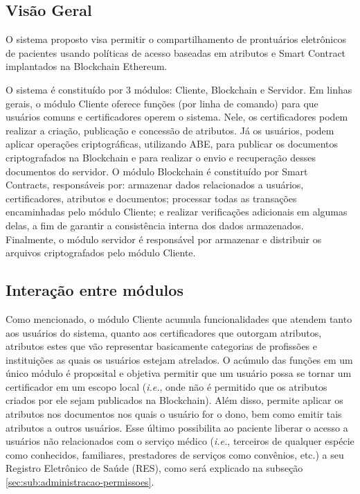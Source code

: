 \documentclass[a4paper,11pt]{article}
\begin{document}
\subsection{Visão Geral}
\label{sec:sub:visaogeral}


O sistema proposto visa permitir o compartilhamento de prontuários eletrônicos de pacientes usando políticas de acesso baseadas em atributos e Smart Contract implantados na Blockchain Ethereum.

O sistema é constituído por 3 módulos: Cliente, Blockchain e Servidor.
Em linhas gerais, o módulo Cliente oferece funções (por linha de comando) para que usuários comuns e certificadores operem o sistema.
Nele, os certificadores podem realizar a criação, publicação e concessão de atributos. Já os usuários, podem aplicar operações criptográficas, utilizando ABE, para publicar os documentos criptografados na Blockchain e para realizar o envio e recuperação desses documentos do servidor.
O módulo Blockchain é constituído por Smart Contracts, responsáveis por: armazenar dados relacionados a usuários, certificadores, atributos e documentos; processar todas as transações encaminhadas pelo módulo Cliente; e realizar verificações adicionais em algumas delas, a fim de garantir a consistência interna dos dados armazenados.
Finalmente, o módulo servidor é responsável por armazenar e distribuir os arquivos criptografados pelo módulo Cliente.


\subsection{Interação entre módulos}
\label{sec:sub:interacao}


Como mencionado, o módulo Cliente acumula funcionalidades que atendem tanto aos usuários do sistema, quanto aos certificadores que outorgam atributos, atributos estes que vão representar basicamente categorias de profissões e instituições as quais os usuários estejam atrelados.
O acúmulo das funções em um único módulo é proposital e objetiva permitir que um usuário possa se tornar um certificador em um escopo local (\emph{i.e.}, onde não é permitido que os atributos criados por ele sejam publicados na Blockchain). Além disso, permite aplicar os atributos nos documentos nos quais o usuário for o dono, bem como emitir tais atributos a outros usuários. Esse último possibilita ao paciente liberar o acesso a usuários não relacionados com o serviço médico (\emph{i.e.}, terceiros de qualquer espécie como conhecidos, familiares, prestadores de serviços como convênios, etc.) a seu Registro Eletrônico de Saúde (RES), como será explicado na subseção \ref{sec:sub:administracao-permissoes}.
\end{document}
